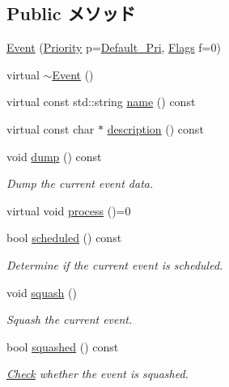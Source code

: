 \subsection*{Public メソッド}
\begin{DoxyCompactItemize}
\item 
\hyperlink{classEvent_a750c02bcebb85221176ec641dd7b669b}{Event} (\hyperlink{classEventBase_a6d92f7ee8144a5911ed46d85a89a4934}{Priority} p=\hyperlink{classEventBase_a6bd0fef0ad63ee49ad5ece92a9dd5f8f}{Default\_\-Pri}, \hyperlink{classFlags}{Flags} f=0)
\item 
virtual \hyperlink{classEvent_aa28124883bfb17601f85db7e635094b1}{$\sim$Event} ()
\item 
virtual const std::string \hyperlink{classEvent_adbcff144e5e199d332a1352af1798148}{name} () const 
\item 
virtual const char $\ast$ \hyperlink{classEvent_a130ddddf003422b413e2e891b1b80e8f}{description} () const 
\item 
void \hyperlink{classEvent_a4a4fecb6d7cd9d0b8eb6579eee183af8}{dump} () const 
\begin{DoxyCompactList}\small\item\em Dump the current event data. \item\end{DoxyCompactList}\item 
virtual void \hyperlink{classEvent_a142b75b68a6291400e20fb0dd905b1c8}{process} ()=0
\item 
bool \hyperlink{classEvent_a9cd69a6b10cb037550943f177a0da688}{scheduled} () const 
\begin{DoxyCompactList}\small\item\em Determine if the current event is scheduled. \item\end{DoxyCompactList}\item 
void \hyperlink{classEvent_a3c68c455d9207edd23ae3bcb7971e653}{squash} ()
\begin{DoxyCompactList}\small\item\em Squash the current event. \item\end{DoxyCompactList}\item 
bool \hyperlink{classEvent_af355b62f22559090d6e3047bdf83f24f}{squashed} () const 
\begin{DoxyCompactList}\small\item\em \hyperlink{classCheck}{Check} whether the event is squashed. \item\end{DoxyCompactList}\item 

\end{DoxyCompactItemize}
